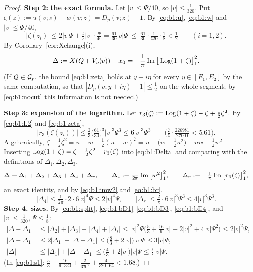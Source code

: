 \begin{proof}
\medskip\noindent\textbf{Step 2: the exact formula.} Let $|v|\le\Psi/40$, so $|v|\le\frac1{320}$. Put $\zeta(z):=u(v;z)-w(v;z)=D_p(v;z)-1$. By \eqref{eq:b1:u}, \eqref{eq:b1:w}
and $|v|\le\Psi/40$,
\begin{equation}\label{eq:b1:zeta}
|\zeta(z_i)|\le2|v|\Psi+\tfrac43|v|\cdot\tfrac{\Psi}{40}=\tfrac{61}{30}|v|\Psi\ \le\ \tfrac{61}{30}\cdot\tfrac1{320}\cdot\tfrac18<\tfrac12\qquad(i=1,2).
\end{equation}
By Corollary~\ref{cor:Xchange}(i),
\begin{equation}\label{eq:b1:Delta}
\Delta:=X(Q+V_p(v))-x_0=-\frac1\pi\operatorname{Im}\big[\operatorname{Log}(1+\zeta)\big]_{1}^{2} .
\end{equation}
(If $Q\in\mathcal{G}_p$, the bound \eqref{eq:b1:zeta} holds at $y+i\eta$ for every $y\in[E_1,E_2]$ by the same computation, so that $|D_p(v;y+i\eta)-1|\le\frac12$ on the whole
segment; by \eqref{eq:b1:nocut} this information is not needed.)

\medskip\noindent\textbf{Step 3: expansion of the logarithm.} Let $r_3(\zeta):=\operatorname{Log}(1+\zeta)-\zeta+\frac12\zeta^2$. By \eqref{eq:b1:L2} and \eqref{eq:b1:zeta},
\[
|r_3(\zeta(z_i))|\le\tfrac23\big(\tfrac{61}{30}\big)^3|v|^3\Psi^3\le6|v|^3\Psi^3\qquad\big(\tfrac23\cdot\tfrac{226981}{27000}<5.61\big).
\]
Algebraically, $\zeta-\frac12\zeta^2=u-w-\frac12(u-w)^2=u-\big(w+\frac12u^2\big)+uw-\frac12w^2$. Inserting $\operatorname{Log}(1+\zeta)=\zeta-\frac12\zeta^2+r_3(\zeta)$ into
\eqref{eq:b1:Delta} and comparing with the definitions of $\Delta_1,\Delta_2,\Delta_3$,
\begin{equation}\label{eq:b1:split}
\Delta=\Delta_1+\Delta_2+\Delta_3+\Delta_4+\Delta_r,\qquad\Delta_4:=\tfrac1{2\pi}\operatorname{Im}\big[w^2\big]_{1}^{2},\qquad\Delta_r:=-\tfrac1\pi\operatorname{Im}\big[r_3(\zeta)\big]_{1}^{2},
\end{equation}
an exact identity, and by \eqref{eq:b1:imw2} and \eqref{eq:b1:br},
\begin{equation}\label{eq:b1:bD4}
|\Delta_4|\le\tfrac1{2\pi}\cdot2\cdot6|v|^4\Psi\le2|v|^4\Psi,\qquad|\Delta_r|\le\tfrac2\pi\cdot6|v|^3\Psi^3\le4|v|^3\Psi^3 .
\end{equation}
\textbf{Step 4: sizes.} By \eqref{eq:b1:split}, \eqref{eq:b1:bD1}--\eqref{eq:b1:bD3}, \eqref{eq:b1:bD4}, and $|v|\le\frac1{320}$, $\Psi\le\frac18$:
\begin{align}
|\Delta-\Delta_1|&\le|\Delta_2|+|\Delta_3|+|\Delta_4|+|\Delta_r|\le|v|^2\Psi\Big(\tfrac53+\tfrac{16}9|v|+2|v|^2+4|v|\Psi^2\Big)\le2|v|^2\Psi,\label{eq:b1:s1}\\
|\Delta+\Delta_1|&\le2|\Delta_1|+|\Delta-\Delta_1|\le\big(\tfrac83+2|v|\big)|v|\Psi\le3|v|\Psi,\label{eq:b1:s2}\\
|\Delta|&\le|\Delta_1|+|\Delta-\Delta_1|\le\big(\tfrac43+2|v|\big)|v|\Psi\le\tfrac32|v|\Psi .\label{eq:b1:s3}
\end{align}
(In \eqref{eq:b1:s1}: $\frac53+\frac{16}{9\cdot320}+\frac2{320^2}+\frac4{320\cdot64}<1.68$.)


\end{proof}
